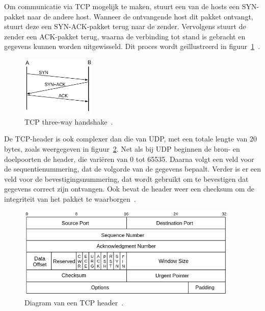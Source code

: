 Om communicatie via TCP mogelijk te maken, stuurt een van de hosts een SYN-pakket naar de andere host.
Wanneer de ontvangende host dit pakket ontvangt, stuurt deze een SYN-ACK-pakket terug naar de zender.
Vervolgens stuurt de zender een ACK-pakket terug, waarna de verbinding tot stand is gebracht en gegevens kunnen worden uitgewisseld.
Dit proces wordt geïllustreerd in figuur~\ref{fig:netwerk-tcp-handshake}~\autocite{hypponen2021securing}.

\begin{figure}[h!]
    \begin{center}
        \includegraphics[width=100pt]
        {./graphics/network/tcp-handshake.png}
        \caption{\label{fig:netwerk-tcp-handshake}TCP three-way handshake~\autocite{dordal2020}.}
    \end{center}
\end{figure}

De TCP-header is ook complexer dan die van UDP, met een totale lengte van 20 bytes, zoals weergegeven in figuur~\ref{fig:netwerk-tcp-header}.
Net als bij UDP beginnen de bron- en doelpoorten de header, die vari\"eren van 0 tot 65535.
Daarna volgt een veld voor de sequentienummering, dat de volgorde van de gegevens bepaalt.
Verder is er een veld voor de bevestigingsnummering, dat wordt gebruikt om te bevestigen dat gegevens correct zijn ontvangen.
Ook bevat de header weer een checksum om de integriteit van het pakket te waarborgen~\autocite{dordal2020}.

\begin{figure}[h!]
    \begin{center}
        \includegraphics[width=300pt]
        {./graphics/network/tcp-header.png}
        \caption{\label{fig:netwerk-tcp-header}Diagram van een TCP header~\autocite{dordal2020}.}
    \end{center}
\end{figure}

